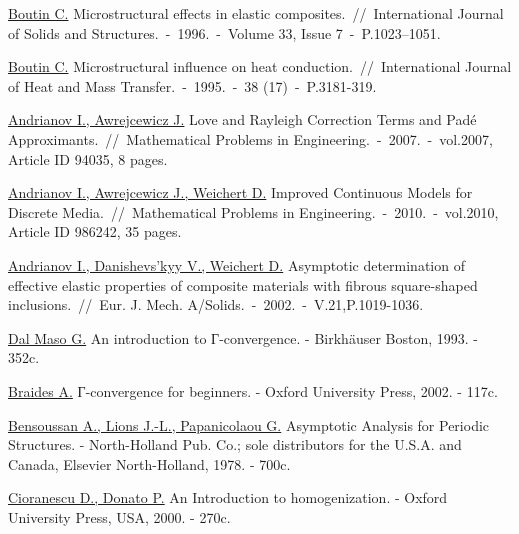 \documentclass[12pt,a4paper]{article}
\begin{document}
\begin{thebibliography}{00}
\href{Articles/Boutin 1996.pdf}{Boutin C.} Microstructural effects in elastic composites.~//~International Journal of Solids and Structures.~-~1996.~-~Volume 33, Issue 7~-~P.1023–1051.

\href{Articles/Boutin 1995.pdf}{Boutin C.}  Microstructural influence on heat conduction.~//~International Journal of Heat and
Mass Transfer.~-~1995.~-~38 (17)~-~P.3181-319.

\href{Articles/Andrianov Awrejcewicz 2007.pdf}{Andrianov I., Awrejcewicz J.} Love and Rayleigh Correction Terms and Padé Approximants.~//~Mathematical Problems in Engineering.~-~2007.~-~vol.2007, Article ID 94035, 8 pages. 

\href{Articles/Andrianov Awrejcewicz Weichert 2010.pdf}{Andrianov I., Awrejcewicz J., Weichert D.} Improved Continuous Models for Discrete Media.~//~Mathematical Problems in Engineering.~-~2010.~-~vol.2010, Article ID 986242, 35 pages. 

\href{Articles/Andrianov Danishevs’kyy Weichert 2002.pdf}{Andrianov I., Danishevs’kyy V., Weichert D.} Asymptotic determination of effective elastic properties of composite materials with fibrous square-shaped inclusions.~//~Eur. J. Mech. A/Solids.~-~2002.~-~V.21,P.1019-1036.








 



\href{Books/Maso - An_introduction_to_G-convergence 1993.djvu}{Dal Maso G.} An introduction to Г-convergence. - 	Birkhäuser Boston, 1993. - 352c.

\href{Books/Braides -Gamma-convergence_for_Beginners 2002.djvu}{Braides A.} Г-convergence for beginners. - 	Oxford University Press, 2002. - 117c. 

\href{Books/Bensoussan Lions Papanicolaou - Asymptotic Analysis for Periodic Structures 1978.djvu}{Bensoussan A., Lions J.-L., Papanicolaou G.} Asymptotic Analysis for Periodic Structures. - 	North-Holland Pub. Co.; sole distributors for the U.S.A. and Canada, Elsevier North-Holland, 1978. - 700c.

\href{Books/Cioranescu Donato-An Introduction to homogenization 2000.djvu}{Cioranescu D., Donato P.} An Introduction to homogenization. - 	Oxford University Press, USA, 2000. - 270c.


\end{thebibliography}
\end{document}
